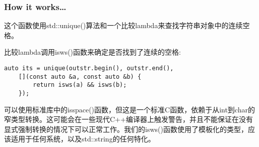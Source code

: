 \subsubsection{How it works…}

这个函数使用std::unique()算法和一个比较lambda来查找字符串对象中的连续空格。

比较lambda调用isws()函数来确定是否找到了连续的空格:

\begin{lstlisting}[style=styleCXX]
auto its = unique(outstr.begin(), outstr.end(),
	[](const auto &a, const auto &b) {
		return isws(a) && isws(b);
	});
\end{lstlisting}

可以使用标准库中的isspace()函数，但这是一个标准C函数，依赖于从int到char的窄类型转换。这可能会在一些现代C++编译器上触发警告，并且不能保证在没有显式强制转换的情况下可以正常工作。我们的isws()函数使用了模板化的类型，应该适用于任何系统，以及std::string的任何特化。


















